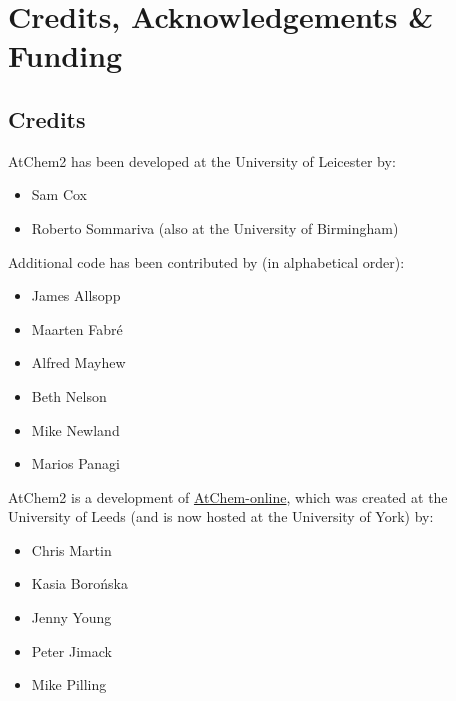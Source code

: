 %
%
%
%

\chapter{Credits, Acknowledgements \& Funding} \label{ch:credits}

\setlength{\parindent}{0pt}

\section{Credits} \label{sec:credits}

AtChem2 has been developed at the University of Leicester by:

\begin{itemize}
\item Sam Cox
\item Roberto Sommariva (also at the University of Birmingham)
\end{itemize}

Additional code has been contributed by (in alphabetical order):

\begin{itemize}
\item James Allsopp
\item Maarten Fabr{\'e}
\item Alfred Mayhew
\item Beth Nelson
\item Mike Newland
\item Marios Panagi
\end{itemize}

AtChem2 is a development of \href{https://atchem.york.ac.uk/}{AtChem-online},
which was created at the University of Leeds (and is now hosted at the
University of York) by:

\begin{itemize}
\item Chris Martin
\item Kasia Boro{\'n}ska
\item Jenny Young
\item Peter Jimack
\item Mike Pilling
\end{itemize}

